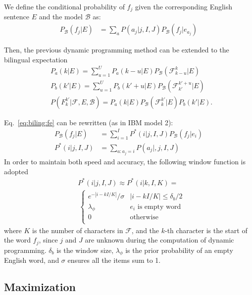 \documentclass[11pt]{article}
\begin{document}
We define the conditional probability of $f_j$ given the corresponding English sentence $E$ and the model $\mathcal{B}$ as:
\begin{align}
P_\mathcal{B}(f_j|E)&=\sum_a P(a_j|j,I,J) P_\mathcal{B}(f_j|e_{a_j}) \label{eq:biling:fe}  
\end{align}

Then, the previous dynamic programming method can be extended to the bilingual expectation
\begin{align}
&P_a(k|E) = \sum_{u=1}^U P_a(k-u|E) P_\mathcal{B}(\mathcal{F}_{k-u}^k|E) \nonumber \\
&P_b(k'|E)=\sum_{u=1}^U P_b(k'+u|E) P_\mathcal{B}(\mathcal{F}_{k'}^{k'+u}|E)\nonumber \\
&P(F_k^{k'}|\mathcal{F},E,\mathcal{B}) =  P_a(k|E) P_\mathcal{B}(\mathcal{F}_k^{k'}|E) P_b(k'|E). \label{eq:biling:dp} 
\end{align}

Eq.~\ref{eq:biling:fe} can be rewritten (as in IBM model 2):
\begin{align}
P_\mathcal{B}(f_j|E)&=\sum_{i=1}^I P^*(i|j,I,J)  P_\mathcal{B}(f_j|e_i)   \label{eq:biling:fe2} \\
P^*(i|j,I,J)&=\sum_{a:a_j=i}P(a_j|,j,I,J) \nonumber
\end{align}
In order to maintain both speed and accuracy, the following window function is adopted 
\begin{align}
&P^*(i|j,I,J) \approx P^*(i|k,I,K) = \nonumber \\ 
& \, \left\{
\begin{array}{ll}
e^{-|i-kI/K|}/\sigma  & |i-kI/K| \leqslant \delta_b/2 \\
\lambda_\phi           & e_i\textrm{ is empty word} \\
0                      & \textrm{otherwise} \\
\end{array}
\right. \label{eq:biling:window}
\end{align}
where $K$ is the number of characters in $\mathcal{F}$, and  the $k$-th character
is the start of the word $f_{j}$,  since $j$ and $J$ are unknown during
the computation of dynamic programming. $\delta_b$ is the window size,
$\lambda_\phi$ is the prior probability of an empty English word,  and
$\sigma$ ensures all the items sum to 1.


\subsection{Maximization}
\label{sec:maximization}
\end{document}
